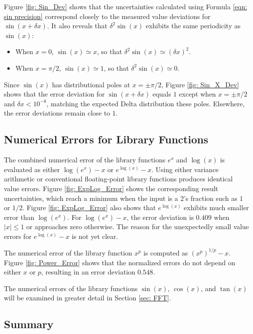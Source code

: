 \documentclass[twoside]{article}
\numberwithin{equation}{section}
\begin{document}
Figure \ref{fig: Sin_Dev} shows that the uncertainties calculated using Formula \eqref{eqn: sin precision} correspond closely to the measured value deviations for $\sin(x + \delta x)$.
It also reveals that $\delta^2 \sin(x)$ exhibits the same periodicity as $\sin(x)$:
\begin{itemize}
\item When $x=0$, $\sin(x) \simeq x$, so that $\delta^2 \sin(x) \simeq (\delta x)^2$.
\item When $x=\pi/2$, $\sin(x) \simeq 1$, so that $\delta^2 \sin(x) \simeq 0$.
\end{itemize}

Since $\sin(x)$ has distributional poles at $x=\pm \pi/2$, Figure \ref{fig: Sin_X_Dev} shows that the error deviation for $\sin(x + \delta x)$ equals $1$ except when $x=\pm \pi/2$ and $\delta x < 10^{-8}$, matching the expected Delta distribution these poles. Elsewhere, the error deviations remain close to $1$.



\subsection{Numerical Errors for Library Functions}

The combined numerical error of the library functions $e^x$ and $\log(x)$ is evaluated as either $\log(e^x) - x$ or $e^{\log(x)} - x$.
Using either variance arithmetic or conventional floating-point library functions produces identical value errors.
Figure \ref{fig: ExpLog_Error} shows the corresponding result uncertainties, which reach a minimum when the input is a 2's fraction such as $1$ or $1/2$.
Figure \ref{fig: ExpLog_Error} also shows that $e^{\log(x)}$ exhibits much smaller error than  $\log(e^x)$.
For $\log(e^x) - x$, the error deviation is $0.409$ when $|x| \leq 1$ or approaches zero otherwise.
The reason for the unexpectedly   small value errors for $e^{\log(x)} - x$ is not yet clear.

The numerical error of the library function $x^p$ is computed as $(x^p)^{1/p} - x$.
Figure \ref{fig: Power_Error} shows that the normalized errors do not depend on either $x$ or $p$, resulting in an error deviation $0.548$.

The numerical errors of the library functions $\sin(x)$, $\cos(x)$, and $\tan(x)$ will be examined in greater detail in Section \ref{sec: FFT}.


\subsection{Summary}
\end{document}
